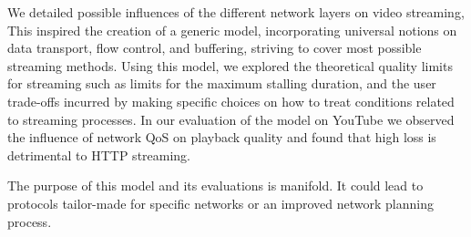 We detailed possible influences of the different network layers on video streaming, This inspired the creation of a generic model, incorporating universal notions on data transport, flow control, and buffering, striving to cover most possible streaming methods. Using this model, we explored the theoretical quality limits for streaming such as limits for the maximum stalling duration, and the user trade-offs incurred by making specific choices on how to treat conditions related to streaming processes. In our evaluation of the model on YouTube we observed the influence of network QoS on playback quality and found that high loss is detrimental to HTTP streaming.

The purpose of this model and its evaluations is manifold. It could lead to protocols tailor-made for specific networks or an improved network planning process.
